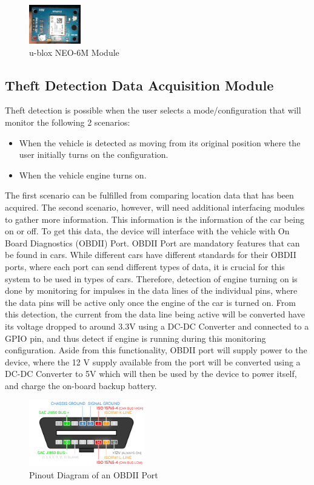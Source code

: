 \documentclass[conference]{IEEEtran}
\begin{document}
\begin{figure}[htbp]
    \centering
    \includegraphics[width=0.2\textwidth]{neo6m}
    \caption{u-blox NEO-6M Module}
    \label{fig1}
\end{figure}

\subsection{Theft Detection Data Acquisition Module}
Theft detection is possible when the user selects a mode/configuration that will monitor the following 2 scenarios: 
\begin{itemize}
\item When the vehicle is detected as moving from its original position where the user initially turns on the configuration.
\item When the vehicle engine turns on.
\end{itemize}
The first scenario can be fulfilled from comparing location data that has been acquired. The second scenario, however, will need 
additional interfacing modules to gather more information. This information is the information of the car being on or off. To get this data, 
the device will interface with the vehicle with On Board Diagnostics (OBDII) Port. OBDII Port are mandatory features that can be found in cars. 
While different cars have different standards for their OBDII ports, where each port can send different types of data, it is crucial for this 
system to be used in types of cars. Therefore, detection of engine turning on is done by monitoring for impulses in the data lines of the individual pins, 
where the data pins will be active only once the engine of the car is turned on. From this detection, the current from the data line being active will be converted 
have its voltage dropped to around 3.3V using a DC-DC Converter and connected to a GPIO pin, and thus detect 
if engine is running during this monitoring configuration. Aside from this functionality, OBDII port will supply power to the device, where the 12 V supply available from the port
will be converted using a DC-DC Converter to 5V which will then be used by the device to power itself, and charge the on-board backup battery. 
\begin{figure}[htbp]
    \centering
    \includegraphics[width=0.45\textwidth]{obddiagram}
    \caption{Pinout Diagram of an OBDII Port}
    \label{fig1}
\end{figure}
\end{document}
